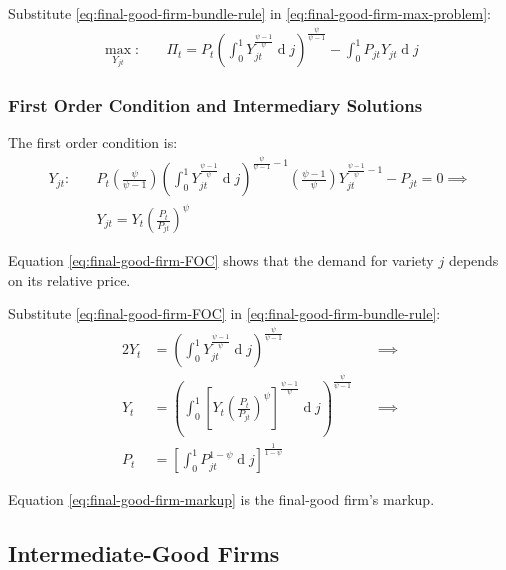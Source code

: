 \documentclass[
	12pt,
	]{article}
\numberwithin{equation}{section}
\DeclareMathOperator{\dif}{d}
\theoremstyle{definition}
\theoremstyle{plain}
\theoremstyle{plain}
\theoremstyle{plain}
\begin{document}
Substitute \ref{eq:final-good-firm-bundle-rule} in \ref{eq:final-good-firm-max-problem}:
\begin{align}
\label{eq:final-good-firm-max-problem-2}
	\max_{Y_{jt}}: & \quad \Pi_t = P_t \left( \int_{0}^{1} Y_{jt}^{\frac{\psi-1}{\psi}} \dif j \right)^{\frac{\psi}{\psi-1}} - \int_{0}^{1} P_{jt} Y_{jt} \dif j
\end{align}

\subsubsection*{First Order Condition and Intermediary Solutions}

The first order condition is:
\begin{align}
	Y_{jt}:\quad & P_t \left( \frac{\psi}{\psi-1} \right) \left( \int_{0}^{1} Y_{jt}^{\frac{\psi-1}{\psi}} \dif j \right)^{\frac{\psi}{\psi-1}-1} \left( \frac{\psi-1}{\psi} \right) Y_{jt}^{\frac{\psi-1}{\psi}-1} - P_{jt} = 0 \implies \nonumber \\
\label{eq:final-good-firm-FOC}
	& Y_{jt} = Y_t \left( \frac{P_t}{P_{jt}} \right)^{\psi}
\end{align}

Equation \ref{eq:final-good-firm-FOC} shows that the demand for variety $j$ depends on its relative price. 

Substitute \ref{eq:final-good-firm-FOC} in \ref{eq:final-good-firm-bundle-rule}:
\begin{alignat}{2}
	Y_t & = \left( \int_{0}^{1} Y_{jt}^{\frac{\psi-1}{\psi}} \dif j \right)^{\frac{\psi}{\psi-1}} &\implies \nonumber \\
	Y_t & = \left( \int_{0}^{1} \left[ Y_t \left( \frac{P_t}{P_{jt}} \right)^{\psi} \right]^{\frac{\psi-1}{\psi}} \dif j \right)^{\frac{\psi}{\psi-1}} \quad &\implies \nonumber \\
	P_t & = \left[ \int_{0}^{1} P_{jt}^{1-\psi} \dif j \right]^{\frac{1}{1-\psi}} \label{eq:final-good-firm-markup}
\end{alignat}

Equation \ref{eq:final-good-firm-markup} is the final-good firm's markup.


\subsection{Intermediate-Good Firms}
\end{document}
